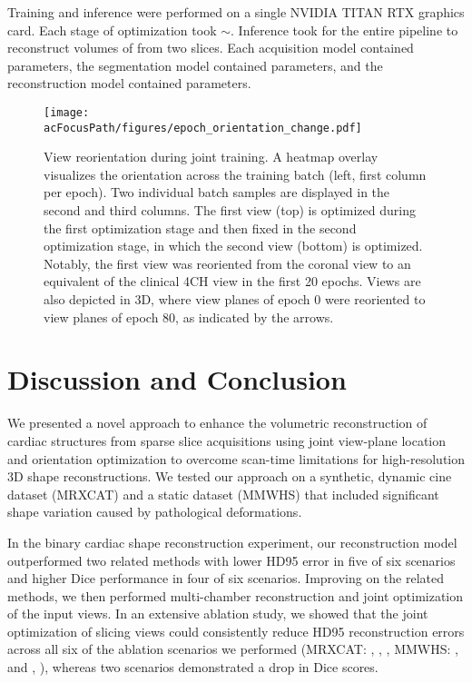            Training and inference were performed on a single NVIDIA TITAN RTX  graphics card. Each stage of optimization took $\sim$.
            Inference took  for the entire pipeline to reconstruct volumes of  from two  slices. Each acquisition model contained  parameters, the segmentation model contained  parameters, and the reconstruction model contained  parameters.
            \begin{figure}
                \texttt{[image: \\acFocusPath/figures/epoch\_orientation\_change.pdf]}
                \caption{View reorientation during joint training. A heatmap overlay visualizes the orientation across the training batch (left, first column per epoch). Two individual batch samples are displayed in the second and third columns. The first view (top) is optimized during the first optimization stage and then fixed in the second optimization stage, in which the second view (bottom) is optimized. Notably, the first view was reoriented from the coronal view to an equivalent of the clinical 4CH view in the first 20 epochs. Views are also depicted in 3D, where view planes of epoch 0 were reoriented to view planes of epoch 80, as indicated by the arrows.}
                \label{fig:resulting_views}
            \end{figure}

\section{Discussion and Conclusion}

     We presented a novel approach to enhance the volumetric reconstruction of cardiac structures from sparse slice acquisitions using joint view-plane location and orientation optimization to overcome scan-time limitations for high-resolution 3D shape reconstructions.
    We tested our approach on a synthetic, dynamic cine dataset (MRXCAT) and a static dataset (MMWHS) that included significant shape variation caused by pathological deformations.

    In the binary cardiac shape reconstruction experiment, our reconstruction model outperformed two related methods with lower HD95 error in five of six scenarios and higher Dice performance in four of six scenarios. Improving on the related methods, we then performed multi-chamber reconstruction and joint optimization of the input views. In an extensive ablation study, we showed that the joint optimization of slicing views could consistently reduce HD95 reconstruction errors across all six of the ablation scenarios we performed (MRXCAT: , , , MMWHS: , and , ), whereas two scenarios demonstrated a drop in Dice scores.

